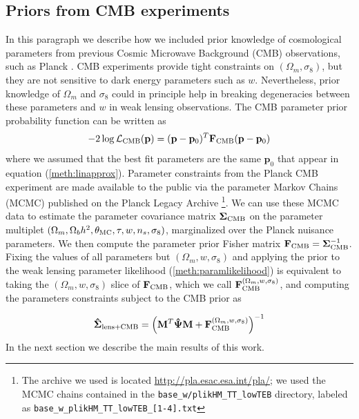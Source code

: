 \documentclass[reprint,aps,prd,superscriptaddress,showkeys,showpacs]{revtex4-1}
\newcommand{\bb}[1]{\mathbf{#1}}
\newcommand{\bbh}[1]{\mathbf{\hat{#1}}}
\newcommand{\ttt}[1]{\texttt{#1}}
\begin{document}
\subsection{Priors from CMB experiments}
In this paragraph we describe how we included prior knowledge of cosmological parameters from previous Cosmic Microwave Background (CMB) observations, such as Planck \citep{PlanckCosmo}. CMB experiments provide tight constraints on $(\Omega_m,\sigma_8)$, but they are not sensitive to dark energy parameters such as $w$. Nevertheless, prior knowledge of $\Omega_m$ and $\sigma_8$ could in principle help in breaking degeneracies between these parameters and $w$ in weak lensing observations. The CMB parameter prior probability function can be written as 
\begin{equation}
-2\log\mathcal{L}_{\rm CMB}(\bb{p}) = (\bb{p} - \bb{p}_0)^T\bb{F}_{\rm CMB}(\bb{p} - \bb{p}_0)
\end{equation}
%
where we assumed that the best fit parameters are the same $\bb{p}_0$ that appear in equation (\ref{meth:linapprox}). 
Parameter constraints from the Planck CMB experiment are made available to the public via the parameter Markov Chains (MCMC) published on the Planck Legacy Archive \footnote{The archive we used is located \url{http://pla.esac.esa.int/pla/}; we used the MCMC chains contained in the \ttt{base\_w/plikHM\_TT\_lowTEB} directory, labeled as \ttt{base\_w\_plikHM\_TT\_lowTEB\_[1-4].txt}}. We can use these MCMC data to estimate the parameter covariance matrix $\bb{\Sigma}_{\rm CMB}$ on the parameter multiplet $(\Omega_m,\Omega_bh^2,\theta_{\rm MC},\tau,w,n_s,\sigma_8)$, marginalized over the Planck nuisance parameters. We then compute the parameter prior Fisher matrix $\bb{F}_{\rm CMB} = \bb{\Sigma}_{\rm CMB}^{-1}$. Fixing the values of all parameters but $(\Omega_m,w,\sigma_8)$ and applying the prior to the weak lensing parameter likelihood (\ref{meth:paramlikelihood}) is equivalent to taking the $(\Omega_m,w,\sigma_8)$ slice of $\bb{F}_{\rm CMB}$, which we call $\bb{F}_{\rm CMB}^{(\Omega_m,w,\sigma_8)}$, and computing the parameters constraints subject to the CMB prior as 

\begin{equation}
\label{meth:parcovestimator_cmb}
\bbh{\Sigma}_{\rm lens+CMB} = \left(\bb{M}^T\bbh{\Psi}\bb{M} + \bb{F}_{\rm CMB}^{(\Omega_m,w,\sigma_8)}\right)^{-1}
\end{equation}
%
In the next section we describe the main results of this work. 

\end{document}

